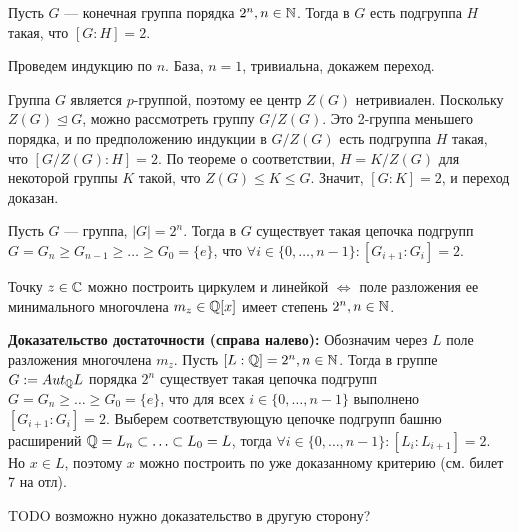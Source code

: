 \par \Statement Пусть $G$ — конечная группа порядка $2^n, n \in \mathbb{N}$. Тогда в $G$ есть подгруппа $H$ такая, что $[G:H]=2$.
\par \Proof Проведем индукцию по $n$. База, $n=1$, тривиальна, докажем переход.
\par Группа $G$ является $p$-группой, поэтому ее центр $Z(G)$ нетривиален. Поскольку $Z(G) \trianglelefteq G$,
можно рассмотреть группу $G/Z(G)$. Это 2-группа меньшего порядка, и по предположению индукции в $G/Z(G)$ есть подгруппа $H$ такая, что $[G/Z(G) : H]=2$. По теореме о
соответствии, $H=K/Z(G)$ для некоторой группы $K$ такой, что $Z(G) \leq K \leq G$. Значит, $[G:K]=2$, и переход доказан.

\par \Cor Пусть $G$ — группа, $|G|=2^n$. Тогда в $G$ существует такая цепочка подгрупп $G=G_n \geq G_{n-1} \geq \ldots \geq G_0 = \{e\}$, что $\forall i \in \{0, \ldots, n-1\}: [G_{i+1}:G_i]=2$.

\par \Th Точку $z \in \mathbb{C}$ можно построить циркулем и линейкой $\Leftrightarrow$ поле разложения ее минимального многочлена $m_z \in \mathbb{Q}[x]$ имеет степень $2^n, n \in \mathbb{N}$.
\par \textbf{Доказательство достаточности (справа налево):} \Proof Обозначим через $L$ поле разложения многочлена $m_z$.
Пусть $[L : \mathbb{Q}]=2^n, n \in \mathbb{N}$. Тогда в группе $G:=Aut_{\mathbb{Q}} L$ порядка $2^n$ существует такая цепочка подгрупп $G=G_n \geq \ldots \geq G_0=\{e\}$, что для всех $i \in \{0, \ldots, n-1\}$ выполнено $[G_{i+1} : G_i]=2$. Выберем соответствующую цепочке подгрупп башню расширений $\mathbb{Q}=L_n \subset \ldots \subset L_0=L$, тогда $\forall i \in \{0, \ldots, n-1\}: [L_i : L_{i+1}]=2$. Но $x \in L$, поэтому $x$ можно построить по уже доказанному критерию (см. билет 7 на отл). \EndProof
\par TODO возможно нужно доказательство в другую сторону?
